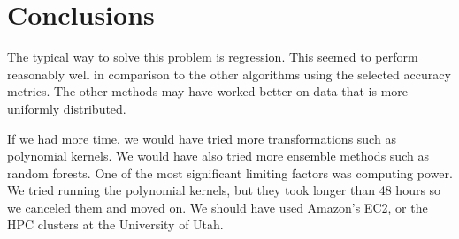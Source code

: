 \documentclass[pdftex,a4paper,11pt]{article}
\begin{document}
\section{Conclusions}
The typical way to solve this problem is regression.  This seemed to perform reasonably well in comparison to the other algorithms using the selected accuracy metrics. The other methods may have worked better on data that is more uniformly distributed.

If we had more time, we would have tried more transformations such as polynomial kernels. We would have also tried more ensemble methods such as random forests. One of the most significant limiting factors was computing power. We tried running the polynomial kernels, but they took longer than 48 hours so we canceled them and moved on. We should have used Amazon's EC2, or the HPC clusters at the University of Utah.



\end{document}
